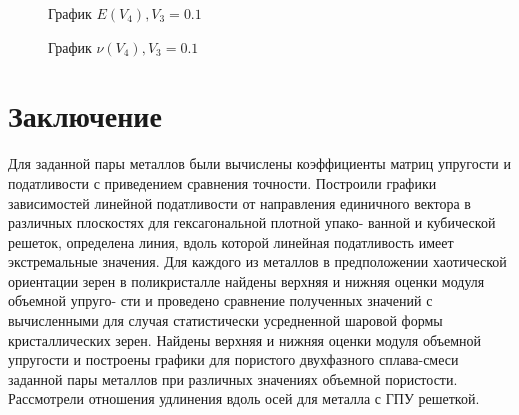 \documentclass[12pt,a4paper]{article}
\begin{document}
    \begin{figure}[h]
        \caption{График $E(V_4), V_3 = 0.1$}
    \end{figure}

    \pagebreak

    \begin{figure}[h]
        \caption{График $\nu(V_4), V_3 = 0.1$}
    \end{figure}

    \section{Заключение}

    Для заданной пары металлов были вычислены коэффициенты матриц упругости и податливости с приведением сравнения точности. Построили графики зависимостей линейной податливости от направления единичного вектора в различных плоскостях для гексагональной плотной упако- ванной и кубической решеток, определена линия, вдоль которой линейная податливость имеет экстремальные значения. Для каждого из металлов в предположении хаотической ориентации зерен в поликристалле найдены верхняя и нижняя оценки модуля объемной упруго- сти и проведено сравнение полученных значений с вычисленными для случая статистически усредненной шаровой формы кристаллических зерен. Найдены верхняя и нижняя оценки модуля объемной упругости и построены графики для пористого двухфазного сплава-смеси заданной пары металлов при различных значениях объемной пористости. Рассмотрели отношения удлинения вдоль осей для металла с ГПУ решеткой.
\end{document}
